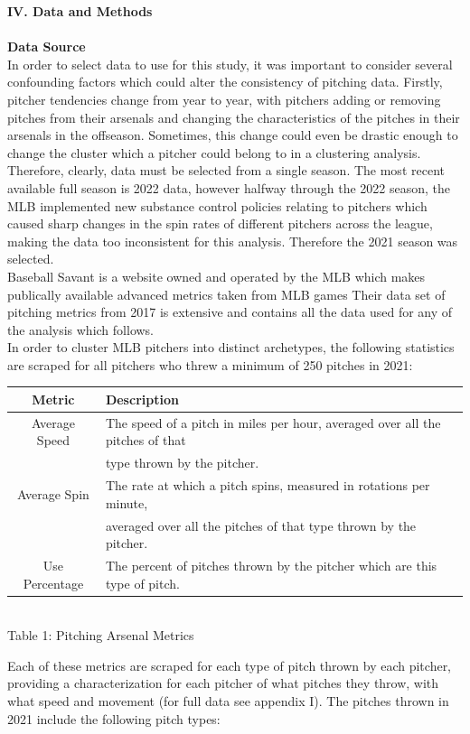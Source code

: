 \documentclass[12 pt]{article}
\begin{document}
\textbf{IV. Data and Methods} \\ \\

\textbf{Data Source} \\
\indent In order to select data to use for this study, it was important to consider 
several confounding factors which could alter the consistency of pitching data. 
Firstly, pitcher tendencies change from year to year, with pitchers adding or removing 
pitches from their arsenals and changing the characteristics of the pitches in their 
arsenals in the offseason. Sometimes, this change could even be drastic enough to change the 
cluster which a pitcher could belong to in a clustering analysis. Therefore, clearly, 
data must be selected from a single season. The most recent available full season is 2022 data, however
halfway through the 2022 season, the MLB implemented new substance control policies 
relating to pitchers which caused sharp changes in the spin rates of different pitchers 
across the league, making the data too inconsistent for this analysis. Therefore the 2021 season was selected.
\\ \indent Baseball Savant is a website owned and operated by the MLB which makes 
publically available advanced metrics taken from MLB games Their data set of pitching 
metrics from 2017 is extensive and contains all the data used for any of the analysis which 
follows. 
\\ \indent In order to cluster MLB pitchers into distinct archetypes, the following 
statistics are scraped for all pitchers who threw a minimum of 250 pitches in 2021:
\begin{center}
    \begin{tabular}{||c | l||} 
     \hline
     Metric & Description  \\ [0.5ex] 
     \hline
     Average Speed & The speed of a pitch in miles per hour, averaged over all the
     pitches of that \\ & type thrown by the pitcher. \\
     \hline
     Average Spin & The rate at which a pitch spins, measured in rotations per minute, \\
     & averaged over all the pitches of that type thrown by the pitcher. \\
     \hline
     Use Percentage & The percent of pitches thrown by the pitcher which are this type of pitch. \\
     \hline
    \end{tabular}
    \newline \\ Table 1: Pitching Arsenal Metrics
\end{center}
\indent Each of these metrics are scraped for each type of pitch thrown by each pitcher, 
providing a characterization for each pitcher of what pitches they throw, with what speed 
and movement (for full data see appendix I). The pitches thrown in 2021 include the 
following pitch types: 
\end{document}
